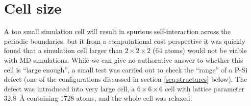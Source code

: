 \documentclass[11pt,bibliography=totoc,index=totoc]{scrbook}   %
\begin{document}






\section{Cell size}

A too small simulation cell will result in spurious self-interaction across the periodic boundaries, but it from 
a computational cost perspective it was quickly found that a simulation cell larger than $2\times 2\times 2$ (64 atoms) would not be viable
with MD simulations. 
While we can give no authorative answer to whether this cell is ``large enough'', a small test was carried out to check the ``range'' of a P-Si defect (one of the configurations discussed in section \ref{seq:structures} below).
The defect was introduced into very large cell, a $6\times 6\times 6$ cell with lattice parameter 32.8~Å containing 1728 atoms, and the whole cell was relaxed.
\end{document}
